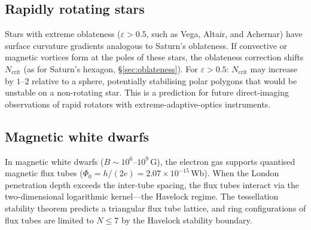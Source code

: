 \subsection{Rapidly rotating stars}

Stars with extreme oblateness ($\varepsilon > 0.5$, such as
Vega, Altair, and Achernar) have surface curvature gradients
analogous to Saturn's oblateness.  If convective or magnetic
vortices form at the poles of these stars, the oblateness
correction shifts $N_{\mathrm{crit}}$ (as for Saturn's hexagon,
\S\ref{sec:oblateness}).  For $\varepsilon > 0.5$:
$N_{\mathrm{crit}}$ may increase by $1$--$2$ relative to a
sphere, potentially stabilising polar polygons that would be
unstable on a non-rotating star.
This is a prediction for future direct-imaging observations
of rapid rotators with extreme-adaptive-optics instruments.

\subsection{Magnetic white dwarfs}

In magnetic white dwarfs ($B \sim 10^6$--$10^9$\,G), the
electron gas supports quantised magnetic flux tubes
($\Phi_0 = h/(2e) = 2.07 \times 10^{-15}$\,Wb).
When the London penetration depth exceeds the inter-tube
spacing, the flux tubes interact via the two-dimensional
logarithmic kernel---the Havelock regime.
The tessellation stability theorem predicts a triangular
flux tube lattice, and ring configurations of flux tubes
are limited to $N \le 7$ by the Havelock stability boundary.




